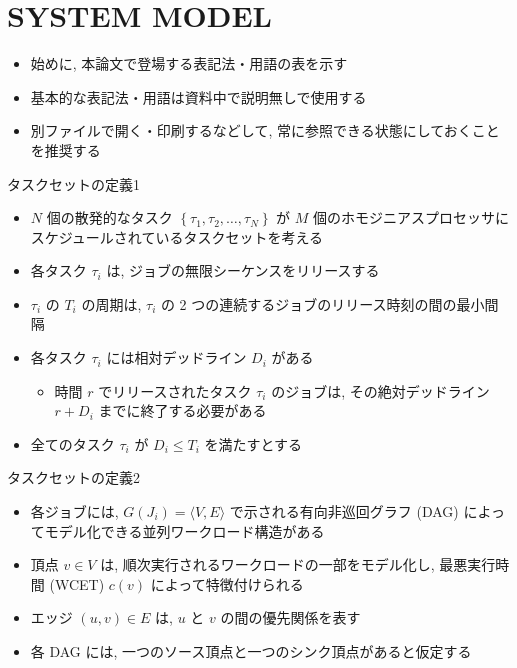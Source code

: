 
\section{SYSTEM MODEL}
\label{sec: system model}

\begin{frame}{}
    \begin{itemize}
        \item 始めに, 本論文で登場する表記法・用語の表を示す
        \item 基本的な表記法・用語は資料中で説明無しで使用する
        \item 別ファイルで開く・印刷するなどして, 常に参照できる状態にしておくことを推奨する
    \end{itemize}
\end{frame}



\begin{frame}{タスクセットの定義1}
    \begin{itemize}
        \item $N$ 個の散発的なタスク $\left\{\tau_{1}, \tau_{2}, \ldots, \tau_{N}\right\}$ が $M$ 個のホモジニアスプロセッサにスケジュールされているタスクセットを考える
        \item 各タスク $\tau_{i}$ は, ジョブの無限シーケンスをリリースする
        \item $\tau_{i}$ の $T_{i}$ の周期は, $\tau_{i}$ の 2 つの連続するジョブのリリース時刻の間の最小間隔
        \item 各タスク $\tau_{i}$ には相対デッドライン $D_{i}$ がある
              \begin{itemize}
                  \item 時間 $r$ でリリースされたタスク $\tau_{i}$ のジョブは, その絶対デッドライン $r+D_{i}$ までに終了する必要がある
              \end{itemize}
        \item 全てのタスク $\tau_{i}$ が $D_{i} \leq T_{i}$ を満たすとする
    \end{itemize}
\end{frame}

\begin{frame}{タスクセットの定義2}
    \begin{itemize}
        \item 各ジョブには, $G\left(J_{i}\right)=\langle V, E\rangle$ で示される有向非巡回グラフ (DAG) によってモデル化できる並列ワークロード構造がある
        \item 頂点 $v \in V$ は, 順次実行されるワークロードの一部をモデル化し, 最悪実行時間 (WCET) $c(v)$ によって特徴付けられる
        \item エッジ $(u, v) \in E$ は, $u$ と $v$ の間の優先関係を表す
        \item 各 DAG には, 一つのソース頂点と一つのシンク頂点があると仮定する
    \end{itemize}
\end{frame}

